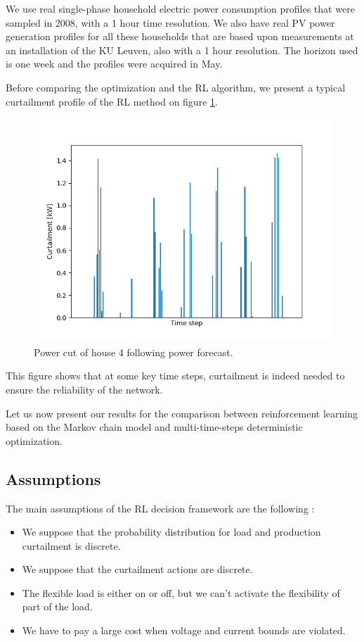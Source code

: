 We use real single-phase household electric power consumption profiles
that were sampled in 2008, with a 1 hour time resolution.
We also have real PV power generation profiles for all these households that are based upon measurements at an installation of the KU Leuven, also with a 1 hour resolution.
The horizon used is one week and the profiles were acquired in May.

Before comparing the optimization and the RL algorithm, we present a typical curtailment profile of the RL method on figure \ref{fig:power_cut}.

\begin{figure}
  \begin{center}
    \includegraphics[scale=0.5]{./img/power_cut.png}
  \end{center}
  \caption{Power cut of house 4 following power forecast.}
  \label{fig:power_cut}
\end{figure}

This figure shows that at some key time steps, curtailment is indeed needed to ensure the reliability of the network.


Let us now present our results for the comparison between reinforcement learning based on the Markov chain model and multi-time-steps deterministic optimization.

\subsection{Assumptions}

The main assumptions of the RL decision framework are the following :
\begin{itemize}
\item We suppose that the probability distribution for load and production curtailment is discrete.
\item We suppose that the curtailment actions are discrete.
\item The flexible load is either on or off, but we can't activate the flexibility of part of the load.
\item We have to pay a large cost when voltage and current bounds are violated.
\end{itemize}

